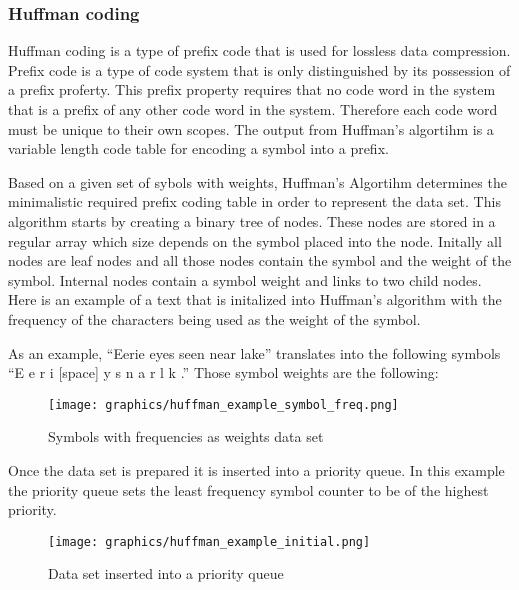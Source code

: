 \documentclass[letterpaper, 12pt]{article}
\begin{document}
\subsubsection{Huffman coding}
Huffman coding is a type of prefix code that is used for lossless data compression. Prefix code is a type
of code system that is only distinguished by its possession of a prefix proferty. This prefix property requires
that no code word in the system that is a prefix of any other code word in the system. Therefore each code word
must be unique to their own scopes. The output from Huffman's algortihm is a variable length code table for encoding
a symbol into a prefix.
\par\vspace{\baselineskip}
Based on a given set of sybols with weights, Huffman's Algortihm determines the minimalistic required prefix coding
table in order to represent the data set. This algorithm starts by creating a binary tree of nodes. These nodes
are stored in a regular array which size depends on the symbol placed into the node. Initally all nodes are leaf
nodes and all those nodes contain the symbol and the weight of the symbol. Internal nodes contain a symbol weight
and links to two child nodes. Here is an example of a text that is initalized into Huffman's algorithm with the
frequency of the characters being used as the weight of the symbol.
\par\vspace{\baselineskip}
As an example, ``Eerie eyes seen near lake'' translates into the following symbols ``E e r i [space] y s n a r l k .''
Those symbol weights are the following:
\par\vspace{\baselineskip}

\begin{figure}
  \centering
  \texttt{[image: graphics/huffman\_example\_symbol\_freq.png]}
  \cite{huffman}
  \caption{Symbols with frequencies as weights data set}
\end{figure}

Once the data set is prepared it is inserted into a priority queue. In this example the priority 
queue sets the least frequency symbol counter to be of the highest priority.
\par\vspace{\baselineskip}

\begin{figure}
  \centering
  \texttt{[image: graphics/huffman\_example\_initial.png]}
  \cite{huffman}
  \caption{Data set inserted into a priority queue}
\end{figure}
\end{document}
